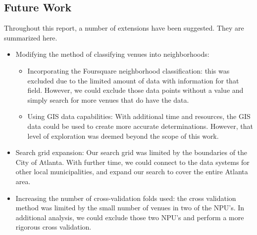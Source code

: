 \documentclass[11pt]{amsart}
\begin{document}
\subsection{Future Work}
Throughout this report, a number of extensions have been suggested. They are summarized here. 
\begin{itemize}
\item Modifying the method of classifying venues into neighborhoods:
\begin{itemize}
\item Incorporating the Foursquare neighborhood classification: this was excluded due to the limited amount of data with information for that field. However, we could exclude those data points without a value and simply search for more venues that do have the data. 
\item  Using GIS data capabilities: With additional time and resources, the GIS data could be used to create more accurate determinations. However, that level of exploration was deemed beyond the scope of this work.
\end{itemize}
\item Search grid expansion: Our search grid was limited by the boundaries of the City of Atlanta. With further time, we could connect to the data systems for other local municipalities, and expand our search to cover the entire Atlanta area. 
\item Increasing the number of cross-validation folds used: the cross validation method was limited by the small number of venues in two of the NPU's. In additional analysis, we could exclude those two NPU's and perform a more rigorous cross validation. 
\end{itemize}


\end{document}
